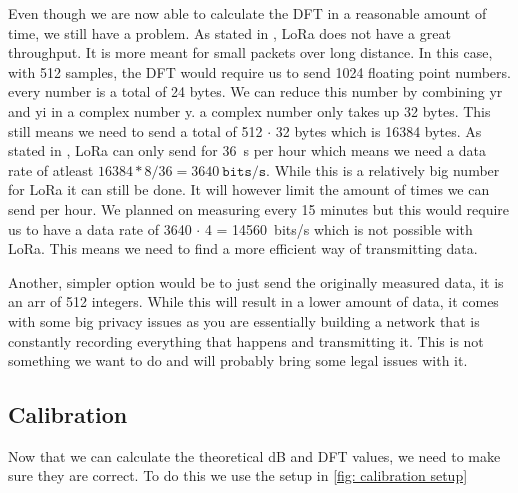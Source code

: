     Even though we are now able to calculate the DFT in a reasonable amount of time, we still have a problem. As stated in , LoRa does not have a great throughput. It is more meant for small packets over long distance. In this case, with 512 samples, the DFT would require us to send 1024 floating point numbers. every number is a total of 24 bytes. We can reduce this number by combining yr and yi in a complex number y. a complex number only takes up 32 bytes. This still means we need to send a total of 512 $\cdot$ 32 bytes which is 16384 bytes. As stated in , LoRa can only send for 36~s per hour which means we need a data rate of atleast $16384 * 8 / 36 = 3640~\texttt{bits/s}$. While this is a relatively big number for LoRa it can still be done. It will however limit the amount of times we can send per hour. We planned on measuring every 15 minutes but this would require us to have a data rate of 3640 $\cdot$ 4 = 14560~bits/s which is not possible with LoRa. This means we need to find a more efficient way of transmitting data.    

    Another, simpler option would be to just send the originally measured data, it is an arr of 512 integers. While this will result in a lower amount of data, it comes with some big privacy issues as you are essentially building a network that is constantly recording everything that happens and transmitting it. This is not something we want to do and will probably bring some legal issues with it.

  \subsection{Calibration}
    Now that we can calculate the theoretical dB and DFT values, we need to make sure they are correct. To do this we use the setup in \cref{fig: calibration setup}

